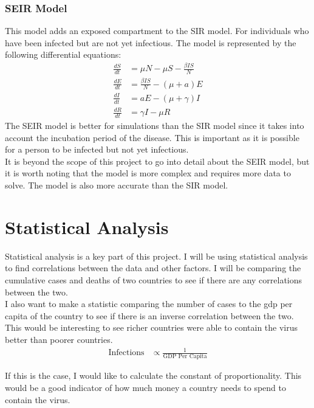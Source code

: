 \documentclass{report}
\begin{document}
\subsubsection{SEIR Model}
This model adds an exposed compartment to the SIR model. For individuals who have been infected but are not yet infectious. The model is represented by the following differential equations:
\begin{align}
\frac{dS}{dt} &= \mu N - \mu S - \frac{\beta IS}{N} \label{seir_model_dS} \\
\frac{dE}{dt} &= \frac{\beta IS}{N} - (\mu + a)E \label{seir_model_dE} \\
\frac{dI}{dt} &= aE - (\mu + \gamma)I \label{seir_model_dI} \\
\frac{dR}{dt} &= \gamma I - \mu R \label{seir_model_dR}
\end{align}
The SEIR model is better for simulations than the SIR model since it takes into account the incubation period of the disease. This is important as it is possible for a person to be infected but not yet infectious.\\
It is beyond the scope of this project to go into detail about the SEIR model, but it is worth noting that the model is more complex and requires more data to solve. The model is also more accurate than the SIR model.

\section{Statistical Analysis}
Statistical analysis is a key part of this project. I will be using statistical analysis to find correlations between the data and other factors. I will be comparing the cumulative cases and deaths of two countries to see if there are any correlations between the two.\\

I also want to make a statistic comparing the number of cases to the gdp per capita of the country to see if there is an inverse correlation between the two. This would be interesting to see richer countries were able to contain the virus better than poorer countries.
\begin{align}
\text{Infections} &\propto \frac{1}{\text{GDP Per Capita}}
\end{align}

If this is the case, I would like to calculate the constant of proportionality. This would be a good indicator of how much money a country needs to spend to contain the virus. \\
\end{document}
